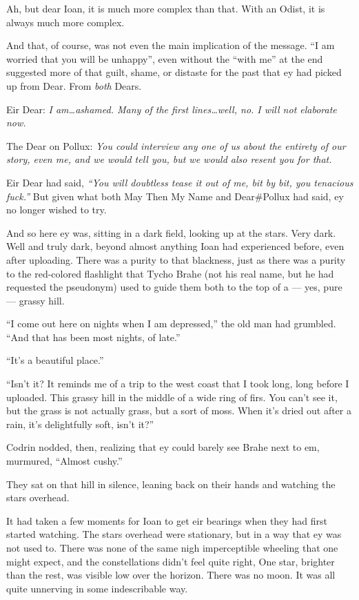 Ah, but dear Ioan, it is much more complex than that. With an Odist, it is always much more complex.

And that, of course, was not even the main implication of the message. ``I am worried that you will be unhappy'', even without the ``with me'' at the end suggested more of that guilt, shame, or distaste for the past that ey had picked up from Dear. From \emph{both} Dears.

Eir Dear: \emph{I am\ldots ashamed. Many of the first lines\ldots well, no. I will not elaborate now.}

The Dear on Pollux: \emph{You could interview any one of us about the entirety of our story, even me, and we would tell you, but we would also resent you for that.}

Eir Dear had said, \emph{``You will doubtless tease it out of me, bit by bit, you tenacious fuck.''} But given what both May Then My Name and Dear\#Pollux had said, ey no longer wished to try.

And so here ey was, sitting in a dark field, looking up at the stars. Very dark. Well and truly dark, beyond almost anything Ioan had experienced before, even after uploading. There was a purity to that blackness, just as there was a purity to the red-colored flashlight that Tycho Brahe (not his real name, but he had requested the pseudonym) used to guide them both to the top of a — yes, pure — grassy hill.

``I come out here on nights when I am depressed,'' the old man had grumbled. ``And that has been most nights, of late.''

``It's a beautiful place.''

``Isn't it? It reminds me of a trip to the west coast that I took long, long before I uploaded. This grassy hill in the middle of a wide ring of firs. You can't see it, but the grass is not actually grass, but a sort of moss. When it's dried out after a rain, it's delightfully soft, isn't it?''

Codrin nodded, then, realizing that ey could barely see Brahe next to em, murmured, ``Almost cushy.''

They sat on that hill in silence, leaning back on their hands and watching the stars overhead.

It had taken a few moments for Ioan to get eir bearings when they had first started watching. The stars overhead were stationary, but in a way that ey was not used to. There was none of the same nigh imperceptible wheeling that one might expect, and the constellations didn't feel quite right, One star, brighter than the rest, was visible low over the horizon. There was no moon. It was all quite unnerving in some indescribable way.

